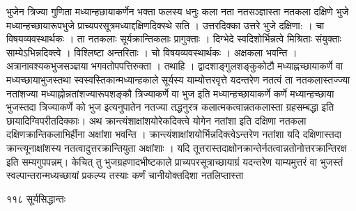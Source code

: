 \documentclass[11pt, openany]{book}
\begin{document}
\begin{sloppypar}
\noindent भुजेन त्रिज्या गुणिता मध्यान्हछायाकर्णेन भक्ता फलस्य धनुः कला नता नतसञ्ज्ञास्ता नतकला दक्षिणे भुजे मध्यान्हच्छायारूपभुजे प्राच्यपरसूत्रमध्याद्दक्षिणदिक्स्थे सति । उत्तरदिक्का उत्तरे भुजे दक्षिणा: । चा विषयव्यवस्थार्थकः । ता नतकलाः सूर्यक्रान्तिकलाः प्रागुक्ताः । दिग्भेदे स्वदिशोर्भिन्नत्वे मिश्रिताः संयुक्ताः साम्येऽभिन्नदिक्त्वे । विश्लिष्टा अन्तरिताः । चो विषयव्यवस्थार्थकः । अक्षकला भवन्ति । अत्रानावश्यकभुजसञ्ज्ञया भगवतोपपत्तिरुक्ता । तथाहि । द्वादशाङ्गुलशङ्कुकोटौ मध्याह्नच्छायाकर्णे वा मध्यच्छायाभुजस्तथा स्वस्वस्तिकान्मध्यान्हकाले सूर्यस्य याम्योत्तरवृत्ते यदन्तरेण नतत्वं ता नतकलास्तज्ज्या नतांशज्या मध्याह्नोन्नतांशज्यारूपशङ्कौ त्रिज्याकर्णे वा भुज इति मध्यान्हच्छायाकर्णे कर्णे मध्यान्हच्छाया भुजस्तदा त्रिज्याकर्णे को भुज इत्यनुपातेन नतज्या तद्धनुरत्र कलात्मकत्वान्नतकलास्ता ग्रहसम्बद्धा इति छायादिग्विपरीतदिक्काः। अथ क्रान्त्यंशाक्षांशयोरेकदिक्त्वे योगेन नतांशा इति दक्षिणा नतकला दक्षिणक्रान्तिकलाभिर्हीना अक्षांशा भवन्ति । क्रान्त्यंशाक्षांशयोर्भिन्नदिक्त्वेऽन्तरेण नतांशा यदि दक्षिणास्तदा क्रान्त्यूनाक्षांशस्य नतत्वादुत्तरक्रान्तियुता अक्षांशाः । यदि तूत्तरास्तदाक्षोनक्रान्तेर्नतत्वान्नतोनोत्तरक्रान्तिरक्ष इति सम्यगुपपन्नम्। केचित् तु भुजग्रहणादभीष्टकाले प्राच्यपरसूत्राच्छायाग्रं यदन्तरेण याम्यमुत्तरं वा भुजस्तं स्वल्पान्तरान्मध्यच्छायां प्रकल्प्य तस्याः कर्णं चानीयोक्तदिशा नतलिप्तास्ता
\end{sloppypar}

\newpage

\noindent ११८ \hspace{4cm} सूर्यसिद्धान्तः 
\vspace{1cm}
\end{document}
